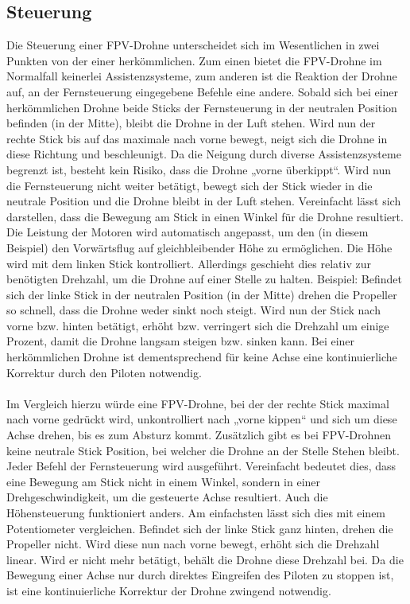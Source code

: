 \subsection[Steuerung]{Steuerung}
    Die Steuerung einer FPV-Drohne unterscheidet sich im Wesentlichen in zwei Punkten von der einer herkömmlichen. Zum einen bietet die FPV-Drohne im Normalfall keinerlei Assistenzsysteme, zum anderen ist die Reaktion der Drohne auf, an der Fernsteuerung eingegebene Befehle eine andere. Sobald sich bei einer herkömmlichen Drohne beide Sticks der Fernsteuerung in der neutralen Position befinden (in der Mitte), bleibt die Drohne in der Luft stehen. Wird nun der rechte Stick bis auf das maximale nach vorne bewegt, neigt sich die Drohne in diese Richtung und beschleunigt. Da die Neigung durch diverse Assistenzsysteme begrenzt ist, besteht kein Risiko, dass die Drohne „vorne überkippt“. Wird nun die Fernsteuerung nicht weiter betätigt, bewegt sich der Stick wieder in die neutrale Position und die Drohne bleibt in der Luft stehen. Vereinfacht lässt sich darstellen, dass die Bewegung am Stick in einen Winkel für die Drohne resultiert. Die Leistung der Motoren wird automatisch angepasst, um den (in diesem Beispiel) den Vorwärtsflug auf gleichbleibender Höhe zu ermöglichen. Die Höhe wird mit dem linken Stick kontrolliert. Allerdings geschieht dies relativ zur benötigten Drehzahl, um die Drohne auf einer Stelle zu halten. Beispiel: Befindet sich der linke Stick in der neutralen Position (in der Mitte) drehen die Propeller so schnell, dass die Drohne weder sinkt noch steigt. Wird nun der Stick nach vorne bzw. hinten betätigt, erhöht bzw. verringert sich die Drehzahl um einige Prozent, damit die Drohne langsam steigen bzw. sinken kann. Bei einer herkömmlichen Drohne ist dementsprechend für keine Achse eine kontinuierliche Korrektur durch den Piloten notwendig. 
    \\ \\
    Im Vergleich hierzu würde eine FPV-Drohne, bei der der rechte Stick maximal nach vorne gedrückt wird, unkontrolliert nach „vorne kippen“ und sich um diese Achse drehen, bis es zum Absturz kommt. Zusätzlich gibt es bei FPV-Drohnen keine neutrale Stick Position, bei welcher die Drohne an der Stelle Stehen bleibt. Jeder Befehl der Fernsteuerung wird ausgeführt. Vereinfacht bedeutet dies, dass eine Bewegung am Stick nicht in einem Winkel, sondern in einer Drehgeschwindigkeit, um die gesteuerte Achse resultiert. Auch die Höhensteuerung funktioniert anders. Am einfachsten lässt sich dies mit einem Potentiometer vergleichen. Befindet sich der linke Stick ganz hinten, drehen die Propeller nicht. Wird diese nun nach vorne bewegt, erhöht sich die Drehzahl linear. Wird er nicht mehr betätigt, behält die Drohne diese Drehzahl bei. Da die Bewegung einer Achse nur durch direktes Eingreifen des Piloten zu stoppen ist, ist eine kontinuierliche Korrektur der Drohne zwingend notwendig.

